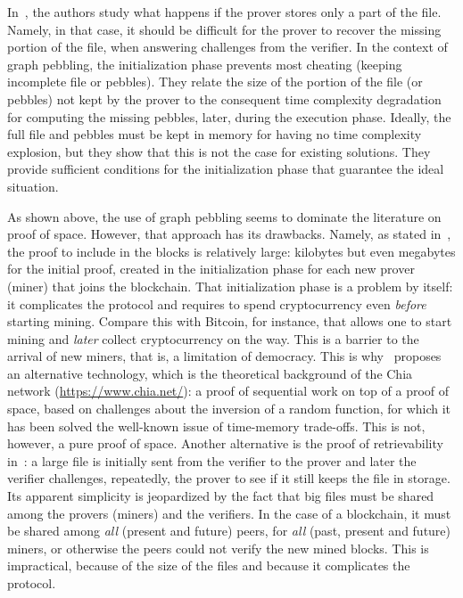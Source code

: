 In~\cite{Reyzin23}, the authors study what happens if the prover stores only a part of the file.
Namely, in that case, it should be difficult for the prover to recover the
missing portion of the file, when answering challenges from the verifier.
In the context of graph pebbling, the initialization phase prevents most cheating
(keeping incomplete file or pebbles). They relate the size
of the portion of the file (or pebbles) not kept by the prover to the consequent time complexity degradation
for computing the missing pebbles, later, during the execution phase.
Ideally, the full file and pebbles must be kept in memory
for having no time complexity explosion, but they show that this is not the case for existing solutions.
They provide sufficient conditions for the initialization phase that guarantee the ideal situation.

As shown above, the use of graph pebbling seems to dominate the literature on proof of space.
However, that approach has its drawbacks.
Namely, as stated in~\cite{AbusalahACKPR17}, the proof to include in the blocks is relatively large:
kilobytes but even megabytes for the initial proof, created in the initialization phase for each new
prover (miner) that joins the blockchain. That initialization phase is a problem by itself: it complicates
the protocol and requires to spend cryptocurrency even \emph{before}
starting mining. Compare this with Bitcoin, for instance, that allows one to start mining
and \emph{later} collect cryptocurrency on the way. This is a barrier to the arrival of new
miners, that is, a limitation of democracy.
This is why~\cite{AbusalahACKPR17} proposes an alternative technology, which is the
theoretical background of the Chia network (\url{https://www.chia.net/}):
a proof of sequential work on top of a proof of space, based on challenges
about the inversion of a random function, for which it has been solved
the well-known issue of time-memory trade-offs. This is not, however, a pure proof of space.
Another alternative is the proof of retrievability in~\cite{JuelsK07}: a large file
is initially sent from the verifier to the prover and later the verifier
challenges, repeatedly, the prover to see if it still keeps the file in storage.
Its apparent simplicity
is jeopardized by the fact that big files must be shared among the provers (miners) and
the verifiers. In the case of a blockchain, it must be shared among \emph{all} (present and future)
peers, for \emph{all} (past, present and future) miners, or otherwise the peers could not verify the new mined blocks.
This is impractical, because of the size of the files and because it complicates the protocol.

